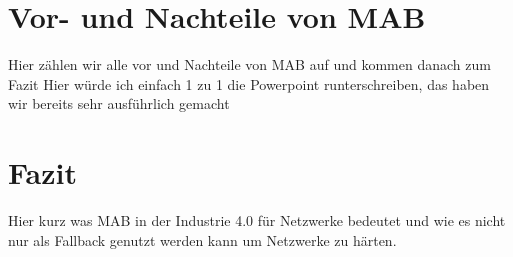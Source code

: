 \documentclass[conference]{IEEEtran}
\begin{document}
\section{Vor- und Nachteile von MAB}
Hier zählen wir alle vor und Nachteile von MAB auf und kommen danach zum Fazit
Hier würde ich einfach 1 zu 1 die Powerpoint runterschreiben, das haben wir bereits sehr ausführlich gemacht

\section{Fazit}
Hier kurz was MAB in der Industrie 4.0 für Netzwerke bedeutet und wie es nicht nur als Fallback genutzt werden kann um Netzwerke zu härten.




\end{document}
